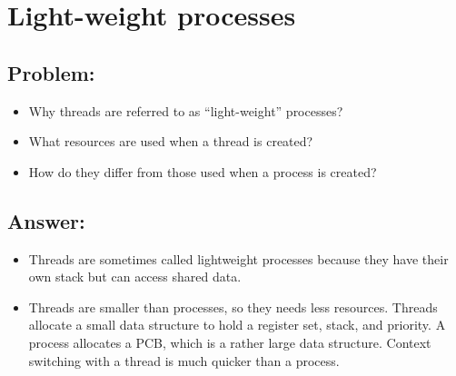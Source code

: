 \newpage
\section{Light-weight processes}
\subsection{Problem:}
\begin{itemize}
    \item Why threads are referred to as “light-weight” processes? 
    \item What resources are used when a thread is created?
    \item How do they differ from those used when a process is created?
\end{itemize}

\subsection{Answer:}
\begin{itemize}
    \item Threads are sometimes called lightweight processes because they have their own stack but can access shared data.
    \item Threads are smaller than processes, so they needs less resources. Threads allocate a small data structure to hold a register set, stack, and priority. A process allocates a PCB, which is a rather large data structure. Context switching with a thread is much quicker than a process.
\end{itemize}

